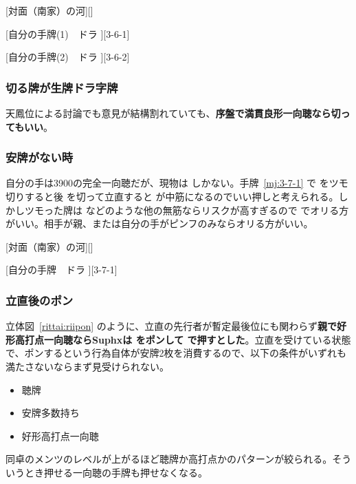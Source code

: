 \documentclass[../nankiru_main.tex]{subfiles}
\begin{document}
[対面（南家）の河][]

[自分の手牌(1)　ドラ ][3-6-1]

[自分の手牌(2)　ドラ ][3-6-2]


\subsubsection*{切る牌が生牌ドラ字牌}

天鳳位による討論でも意見が結構割れていても、\textbf{序盤で満貫良形一向聴なら切ってもいい}\citep[][pp.~114--115]{tetsuoshi}。


\subsubsection*{安牌がない時}

自分の手は3900の完全一向聴だが、現物は  しかない。手牌~\ref{mj:3-7-1} で  をツモ切りすると後  を切って立直すると  が中筋になるのでいい押しと考えられる。しかしツモった牌は  などのような他の無筋ならリスクが高すぎるので  でオリる方がいい。相手が親、または自分の手がピンフのみならオリる方がいい\citep[][pp.122--127]{tetsuoshi}。

[対面（南家）の河][]

[自分の手牌　ドラ ][3-7-1]


\subsubsection*{立直後のポン}

立体図~\ref{rittai:riipon} のように、立直の先行者が暫定最後位にも関わらず\textbf{親で好形高打点一向聴ならSuphxは  をポンして  で押すとした}\citep[][pp.~46--47]{suphx}。立直を受けている状態で、ポンするという行為自体が安牌2枚を消費するので、以下の条件がいずれも満たさないならまず見受けられない。

\begin{itemize}
\item 聴牌
\item 安牌多数持ち
\item 好形高打点一向聴
\end{itemize}

同卓のメンツのレベルが上がるほど聴牌か高打点かのパターンが絞られる。そういうとき押せる一向聴の手牌も押せなくなる。
\end{document}
